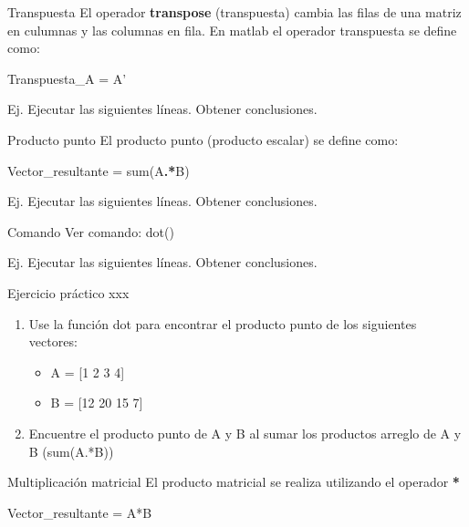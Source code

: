 \begin{frame}{Transpuesta}
El operador \textbf{transpose} (transpuesta) cambia las filas de una matriz en culumnas y las columnas en fila. En matlab el operador transpuesta se define como:
\begin{center}
Transpuesta\_A = A'
\end{center}
Ej. Ejecutar las siguientes líneas. Obtener conclusiones.
\end{frame}

\begin{frame}{Producto punto}
El producto punto (producto escalar) se define como:
\begin{center}
Vector\_resultante = sum(A\textbf{.*}B)
\end{center}
Ej. Ejecutar las siguientes líneas. Obtener conclusiones.
\begin{exampleblock}{Comando}
Ver comando: dot()
\end{exampleblock}
Ej. Ejecutar las siguientes líneas. Obtener conclusiones.
\end{frame}

\begin{frame}{Ejercicio práctico xxx}
\begin{enumerate}
\item Use la función dot para encontrar el producto punto de los siguientes vectores:
\begin{itemize}
\item A = [1 2 3 4]
\item B = [12 20 15 7]
\end{itemize}
\item Encuentre el producto punto de A y B al sumar los productos arreglo de A y B (sum(A.*B))
\end{enumerate}
\end{frame}

\begin{frame}{Multiplicación matricial}
El producto matricial se realiza utilizando el operador \textbf{*}
\begin{center}
Vector\_resultante = A*B
\end{center}
\end{frame}


